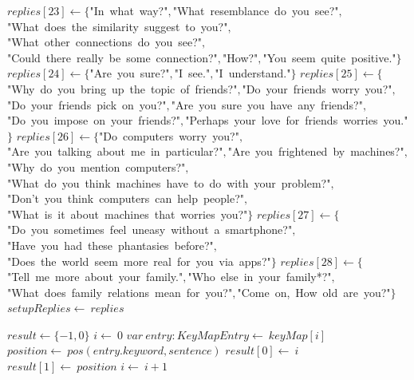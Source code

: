 \documentclass[a4paper,10pt]{article}
\begin{document}
\begin{algorithm}
\begin{algorithmic}[5]
  \STATE \(replies[23]\gets\{\)"{}In\ what\ way?"{}\(,\)"{}What\ resemblance\ do\ you\ see?"{}\(,\)"{}What\ does\ the\ similarity\ suggest\ to\ you?"{}\(,\)"{}What\ other\ connections\ do\ you\ see?"{}\(,\)"{}Could\ there\ really\ be\ some\ connection?"{}\(,\)"{}How?"{}\(,\)"{}You\ seem\ quite\ positive."{}\(\}\)
  \STATE \(replies[24]\gets\{\)"{}Are\ you\ sure?"{}\(,\)"{}I\ see."{}\(,\)"{}I\ understand."{}\(\}\)
  \STATE \(replies[25]\gets\{\)"{}Why\ do\ you\ bring\ up\ the\ topic\ of\ friends?"{}\(,\)"{}Do\ your\ friends\ worry\ you?"{}\(,\)"{}Do\ your\ friends\ pick\ on\ you?"{}\(,\)"{}Are\ you\ sure\ you\ have\ any\ friends?"{}\(,\)"{}Do\ you\ impose\ on\ your\ friends?"{}\(,\)"{}Perhaps\ your\ love\ for\ friends\ worries\ you."{}\(\}\)
  \STATE \(replies[26]\gets\{\)"{}Do\ computers\ worry\ you?"{}\(,\)"{}Are\ you\ talking\ about\ me\ in\ particular?"{}\(,\)"{}Are\ you\ frightened\ by\ machines?"{}\(,\)"{}Why\ do\ you\ mention\ computers?"{}\(,\)"{}What\ do\ you\ think\ machines\ have\ to\ do\ with\ your\ problem?"{}\(,\)"{}Don'{}t\ you\ think\ computers\ can\ help\ people?"{}\(,\)"{}What\ is\ it\ about\ machines\ that\ worries\ you?"{}\(\}\)
  \STATE \(replies[27]\gets\{\)"{}Do\ you\ sometimes\ feel\ uneasy\ without\ a\ smartphone?"{}\(,\)"{}Have\ you\ had\ these\ phantasies\ before?"{}\(,\)"{}Does\ the\ world\ seem\ more\ real\ for\ you\ via\ apps?"{}\(\}\)
  \STATE \(replies[28]\gets\{\)"{}Tell\ me\ more\ about\ your\ family."{}\(,\)"{}Who\ else\ in\ your\ family*?"{}\(,\)"{}What\ does\ family\ relations\ mean\ for\ you?"{}\(,\)"{}Come\ on,\ How\ old\ are\ you?"{}\(\}\)
  \STATE \(setupReplies\gets\ replies\)

\end{algorithmic}
\end{algorithm}


\begin{algorithm}
\caption{findKeyword(keyMap, sentence)}
\begin{algorithmic}[5]

\STATE {}
\STATE {}
\STATE {}
\STATE {}
\STATE {}
\STATE {}
  \STATE \(result\gets\{-1,0\}\)
  \STATE \(i\gets\ 0\)
    \STATE \(var\ entry:KeyMapEntry\gets\ keyMap[i]\)
    \STATE \(position\gets\ pos(entry.keyword,sentence)\)
      \STATE \(result[0]\gets\ i\)
      \STATE \(result[1]\gets\ position\)
    \ENDIF
    \STATE \(i\gets\ i+1\)
  \ENDWHILE

\end{algorithmic}
\end{algorithm}
\end{document}
